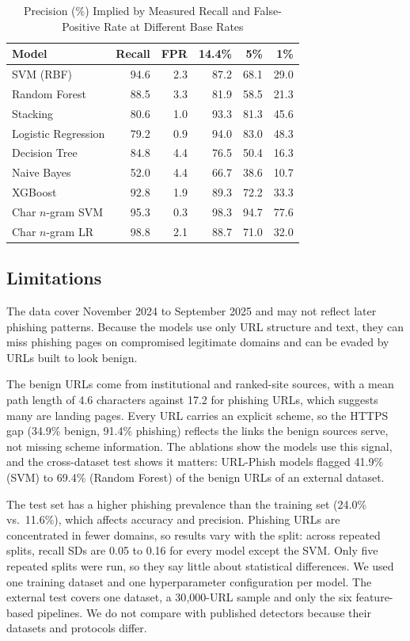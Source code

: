 \documentclass[conference]{IEEEtran}
\begin{document}
\begin{table}[htbp]
\centering
\caption{Precision (\%) Implied by Measured Recall and False-Positive Rate at Different Base Rates}
\label{tab:baserate}
\small
\begin{tabular}{lrrrrr}
\toprule
Model & Recall & FPR & 14.4\% & 5\% & 1\% \\
\midrule
SVM (RBF) & 94.6 & 2.3 & 87.2 & 68.1 & 29.0 \\
Random Forest & 88.5 & 3.3 & 81.9 & 58.5 & 21.3 \\
Stacking & 80.6 & 1.0 & 93.3 & 81.3 & 45.6 \\
Logistic Regression & 79.2 & 0.9 & 94.0 & 83.0 & 48.3 \\
Decision Tree & 84.8 & 4.4 & 76.5 & 50.4 & 16.3 \\
Naive Bayes & 52.0 & 4.4 & 66.7 & 38.6 & 10.7 \\
\midrule
XGBoost & 92.8 & 1.9 & 89.3 & 72.2 & 33.3 \\
Char $n$-gram SVM & 95.3 & 0.3 & 98.3 & 94.7 & 77.6 \\
Char $n$-gram LR & 98.8 & 2.1 & 88.7 & 71.0 & 32.0 \\
\bottomrule
\end{tabular}
\end{table}

\subsection{Limitations}
\label{sec:limitations}
The data cover November 2024 to September 2025 and may not reflect later phishing patterns. Because the models use only URL structure and text, they can miss phishing pages on compromised legitimate domains and can be evaded by URLs built to look benign.

The benign URLs come from institutional and ranked-site sources, with a mean path length of 4.6 characters against 17.2 for phishing URLs, which suggests many are landing pages. Every URL carries an explicit scheme, so the HTTPS gap (34.9\% benign, 91.4\% phishing) reflects the links the benign sources serve, not missing scheme information. The ablations show the models use this signal, and the cross-dataset test shows it matters: URL-Phish models flagged 41.9\% (SVM) to 69.4\% (Random Forest) of the benign URLs of an external dataset.

The test set has a higher phishing prevalence than the training set (24.0\% vs.\ 11.6\%), which affects accuracy and precision. Phishing URLs are concentrated in fewer domains, so results vary with the split: across repeated splits, recall SDs are 0.05 to 0.16 for every model except the SVM. Only five repeated splits were run, so they say little about statistical differences. We used one training dataset and one hyperparameter configuration per model. The external test covers one dataset, a 30{,}000-URL sample and only the six feature-based pipelines. We do not compare with published detectors because their datasets and protocols differ.
\end{document}
